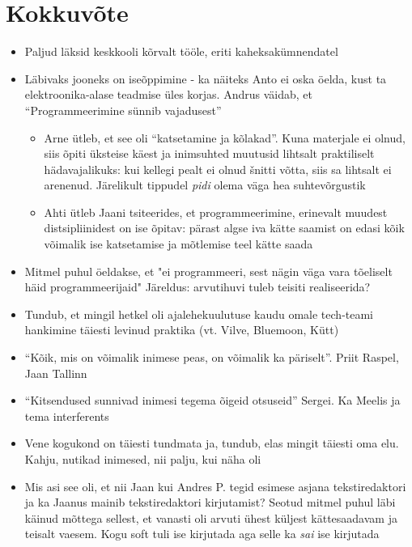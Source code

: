 \documentclass{tufte-book}
\let\oldchapter\chapter
\def\chapter{%
  \setcounter{footnote}{0}%
  \oldchapter
}
\begin{document}
\chapter{Kokkuvõte}
\begin{itemize}
	\item Paljud läksid keskkooli kõrvalt tööle, eriti kaheksakümnendatel
	\item Läbivaks jooneks on iseõppimine - ka näiteks Anto ei oska öelda, kust ta elektroonika-alase teadmise üles korjas. Andrus väidab, et \enquote{Programmeerimine sünnib vajadusest}
	\begin{itemize}
		\item Arne ütleb, et see oli \enquote{katsetamine ja kõlakad}. Kuna materjale ei olnud, siis õpiti üksteise käest ja inimsuhted muutusid lihtsalt praktiliselt hädavajalikuks: kui kellegi pealt ei olnud šnitti võtta, siis sa lihtsalt ei arenenud. Järelikult tippudel \emph{pidi} olema väga hea suhtevõrgustik
		\item Ahti ütleb Jaani tsiteerides, et programmeerimine, erinevalt muudest distsipliinidest on ise õpitav: pärast algse iva kätte saamist on edasi kõik võimalik ise katsetamise ja mõtlemise teel kätte saada
	\end{itemize}
	\item Mitmel puhul öeldakse, et "ei programmeeri, sest nägin väga vara tõeliselt häid programmeerijaid" Järeldus: arvutihuvi tuleb teisiti realiseerida?
	\item Tundub, et mingil hetkel oli ajalehekuulutuse kaudu omale tech-teami hankimine täiesti levinud praktika (vt. Vilve, Bluemoon, Kütt)
	\item \enquote{Kõik, mis on võimalik inimese peas, on võimalik ka päriselt}. Priit Raspel, Jaan Tallinn
	\item \enquote{Kitsendused sunnivad inimesi tegema õigeid otsuseid} Sergei. Ka Meelis ja tema interferents
	\item Vene kogukond on täiesti tundmata ja, tundub, elas mingit täiesti oma elu. Kahju, nutikad inimesed, nii palju, kui näha oli
	\item Mis asi see oli, et nii Jaan kui Andres P. tegid esimese asjana tekstiredaktori ja ka Jaanus mainib tekstiredaktori kirjutamist? Seotud mitmel puhul läbi käinud mõttega sellest, et vanasti oli arvuti ühest küljest kättesaadavam ja teisalt vaesem. Kogu soft tuli ise kirjutada aga selle ka \emph{sai} ise kirjutada

\end{itemize}
\end{document}
